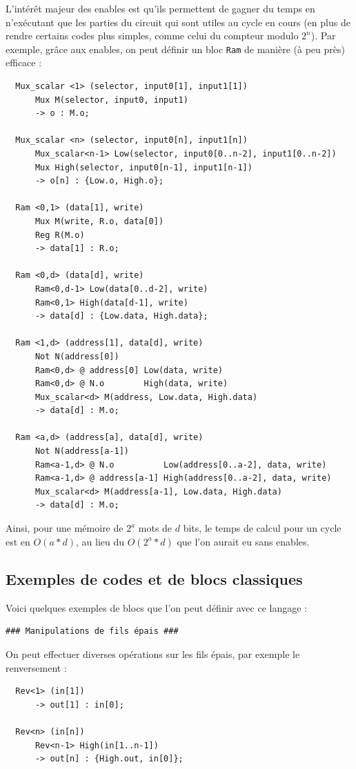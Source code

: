 \documentclass[13pt]{article}
\begin{document}
L'intérêt majeur des enables est qu'ils permettent de gagner du temps en
n'exécutant que les parties du circuit qui sont utiles au cycle en cours
(en plus de rendre certains codes plus simples, comme celui du compteur
modulo $2^n$). Par exemple, grâce aux enables, on peut définir un bloc
\texttt{Ram} de manière (à peu près) efficace :
\begin{verbatim}
  Mux_scalar <1> (selector, input0[1], input1[1])
      Mux M(selector, input0, input1)
      -> o : M.o;

  Mux_scalar <n> (selector, input0[n], input1[n])
      Mux_scalar<n-1> Low(selector, input0[0..n-2], input1[0..n-2])
      Mux High(selector, input0[n-1], input1[n-1])
      -> o[n] : {Low.o, High.o};

  Ram <0,1> (data[1], write)
      Mux M(write, R.o, data[0])
      Reg R(M.o)
      -> data[1] : R.o;

  Ram <0,d> (data[d], write)
      Ram<0,d-1> Low(data[0..d-2], write)
      Ram<0,1> High(data[d-1], write)
      -> data[d] : {Low.data, High.data};

  Ram <1,d> (address[1], data[d], write)
      Not N(address[0])
      Ram<0,d> @ address[0] Low(data, write)
      Ram<0,d> @ N.o        High(data, write)
      Mux_scalar<d> M(address, Low.data, High.data)
      -> data[d] : M.o;

  Ram <a,d> (address[a], data[d], write)
      Not N(address[a-1])
      Ram<a-1,d> @ N.o          Low(address[0..a-2], data, write)
      Ram<a-1,d> @ address[a-1] High(address[0..a-2], data, write)
      Mux_scalar<d> M(address[a-1], Low.data, High.data)
      -> data[d] : M.o;
\end{verbatim}
Ainsi, pour une mémoire de $2^a$ mots de $d$ bits, le temps de calcul pour un
cycle est en $O(a*d)$, au lieu du $O(2^a * d)$ que l'on aurait eu sans enables.


\subsection{Exemples de codes et de blocs classiques}
Voici quelques exemples de blocs que l'on peut définir avec ce langage :

\begin{verbatim}
### Manipulations de fils épais ###
\end{verbatim}

On peut effectuer diverses opérations sur les fils épais, par exemple le
renversement :

\begin{verbatim}
  Rev<1> (in[1])
      -> out[1] : in[0];

  Rev<n> (in[n])
      Rev<n-1> High(in[1..n-1])
      -> out[n] : {High.out, in[0]};
\end{verbatim}
\end{document}
